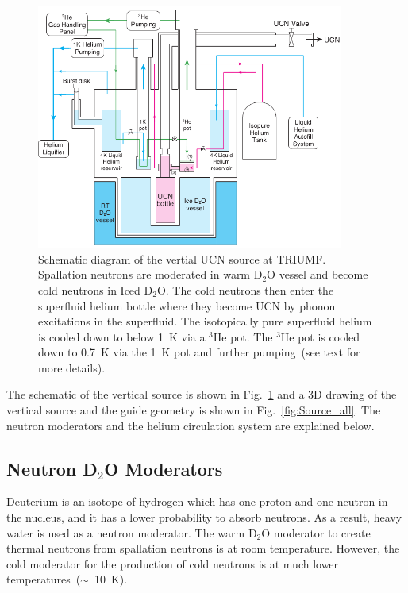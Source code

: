 \begin{figure}[h!]
  \centering
  \includegraphics[width=0.9\textwidth]{vertical_source.png}
  \caption{Schematic diagram of the vertial UCN source at
    TRIUMF. Spallation neutrons are moderated in warm D$_2$O vessel
    and become cold neutrons in Iced D$_2$O. The cold neutrons then
    enter the superfluid helium bottle where they become UCN by phonon
    excitations in the superfluid. The isotopically pure superfluid
    helium is cooled down to below 1~K via a $^3$He pot. The $^3$He
    pot is cooled down to 0.7~K via the 1~K pot and further
    pumping~(see text for more details). }
  \label{fig:source}
\end{figure}



The schematic of the vertical source is shown in Fig.~\ref{fig:source}
and a 3D drawing of the vertical source and the guide geometry is
shown in Fig.~\ref{fig:Source_all}. The neutron moderators and the
helium circulation system are explained below.


\subsection{Neutron D$_2$O Moderators}
Deuterium is an isotope of hydrogen which has one proton and one
neutron in the nucleus, and it has a lower probability to absorb
neutrons. As a result, heavy water is used as a neutron moderator. The
warm D$_2$O moderator to create thermal neutrons from spallation
neutrons is at room temperature. However, the cold moderator for the
production of cold neutrons is at much lower
temperatures~($\sim$~10~K).

